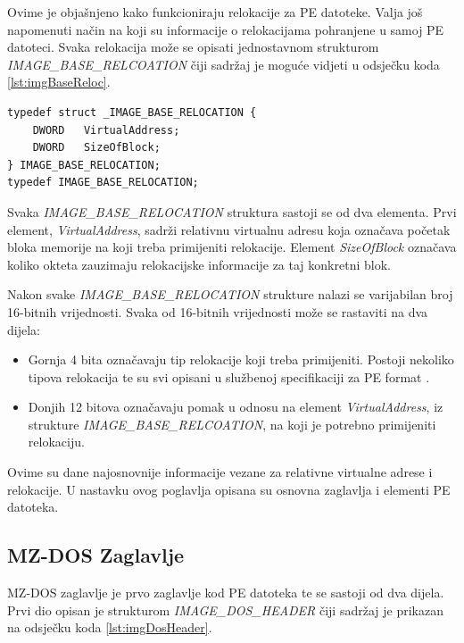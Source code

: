 \documentclass[times, utf8, diplomski, numeric]{fer}
\begin{document}
Ovime je objašnjeno kako funkcioniraju relokacije za PE datoteke.
Valja još napomenuti način na koji su informacije o relokacijama
pohranjene u samoj PE datoteci. Svaka relokacija može se opisati
jednostavnom strukturom \emph{IMAGE\_BASE\_RELCOATION} čiji
sadržaj je moguće vidjeti u odsječku koda \ref{lst:imgBaseReloc}.

\begin{lstlisting}[frame=single, caption=IMAGE\_BASE\_RELOCATION struktura, label={lst:imgBaseReloc}]
typedef struct _IMAGE_BASE_RELOCATION {
    DWORD   VirtualAddress;
    DWORD   SizeOfBlock;
} IMAGE_BASE_RELOCATION;
typedef IMAGE_BASE_RELOCATION;
\end{lstlisting}

Svaka \emph{IMAGE\_BASE\_RELOCATION} struktura sastoji se od dva			%
elementa. Prvi element, \emph{VirtualAddress}, sadrži relativnu
virtualnu adresu koja označava početak bloka memorije na koji
treba primijeniti relokacije. Element \emph{SizeOfBlock} označava
koliko okteta zauzimaju relokacijske informacije za taj konkretni
blok. 

Nakon svake \emph{IMAGE\_BASE\_RELOCATION} strukture nalazi se
varijabilan broj 16-bitnih vrijednosti. Svaka od 16-bitnih
vrijednosti može se rastaviti na dva dijela:

\begin{itemize}
\item Gornja 4 bita označavaju tip relokacije koji treba
primijeniti. Postoji nekoliko tipova relokacija te su svi opisani
u službenoj specifikaciji za PE format \citep{pe_spec}.

\item Donjih 12 bitova označavaju pomak u odnosu na element
\emph{VirtualAddress}, iz strukture
\emph{IMAGE\_BASE\_RELCOATION}, na koji je potrebno primijeniti
relokaciju.
\end{itemize}

Ovime su dane najosnovnije informacije vezane za relativne
virtualne adrese i relokacije. U nastavku ovog poglavlja opisana
su osnovna zaglavlja i elementi PE datoteka.

\pagebreak

\subsection{MZ-DOS Zaglavlje}

MZ-DOS zaglavlje je prvo zaglavlje kod PE datoteka te se sastoji
od dva dijela. Prvi dio opisan je strukturom
\emph{IMAGE\_DOS\_HEADER} čiji sadržaj je prikazan na odsječku
koda \ref{lst:imgDosHeader}.
\end{document}
